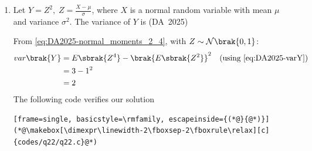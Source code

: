 \begin{enumerate}[label=\thesubsection.\arabic*, ref=\thesubsection.\theenumi]
	\hfill (DA~2025)
	\\
	\solution
	From \eqref{eq:DA2025-bayes_error}:
	\begin{align}
		Pr\brak{\text{error} \mid \vec{x}} &= \frac{\min_k Pr\brak{\vec{x} \mid y_k} Pr\brak{y_k}}{Pr\brak{\vec{x}}}
		\\
		&= \frac{\min\brak{\frac{3}{4} \cdot \frac{1}{3}, \frac{1}{4} \cdot \frac{2}{3}}}{\frac{3}{4} \cdot \frac{1}{3} + \frac{1}{4} \cdot \frac{2}{3}}
		\\
		&= \frac{\min\brak{\frac{1}{4}, \frac{1}{6}}}{\frac{1}{4} + \frac{1}{6}}
		\\
		&= \frac{\frac{1}{6}}{\frac{5}{12}}
		\\
		&= \frac{2}{5} = 0.4
	\end{align}
	
\item 
Let $Y = Z^2, \; Z = \frac{X - \mu}{\sigma}$, where $X$ is a normal random variable with mean $\mu$ and variance $\sigma^2$. The variance of $Y$ is
\hfill (DA~2025)
\begin{enumerate}
	\begin{multicols}{4}
		\item $1$
		\item $2$
		\item $3$
		\item $4$
	\end{multicols}
\end{enumerate}
\solution
From \eqref{eq:DA2025-normal_moments_2_4}, with $Z \sim \mathcal{N}\brak{0, 1}$:
\begin{align}
	var\brak{Y} &= E\sbrak{Z^4} - \brak{E\sbrak{Z^2}}^2 \quad \text{(using \eqref{eq:DA2025-varY})}
	\\
	&= 3 - 1^2 
	\\
	&= 2
\end{align}
			The following code verifies our solution
\begin{lstlisting}[frame=single, basicstyle=\rmfamily, escapeinside={(*@}{@*)}]
(*@\makebox[\dimexpr\linewidth-2\fboxsep-2\fboxrule\relax][c]{codes/q22/q22.c}@*)
\end{lstlisting}
	

\end{enumerate}
